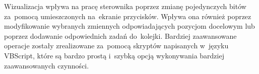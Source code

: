 Wizualizacja wpływa na pracę sterownika poprzez zmianę pojedynczych bitów za~pomocą umieszczonych na~ekranie przycisków. Wpływa ona również poprzez modyfikowanie wybranych zmiennych odpowiadających pozycjom docelowym lub poprzez dodawanie odpowiednich zadań do~kolejki. Bardziej zaawansowane operacje zostały zrealizowane za~pomocą skryptów napisanych w~języku VBScript, które są bardzo prostą i~szybką opcją wykonywania bardziej zaawansowanych czynności. 